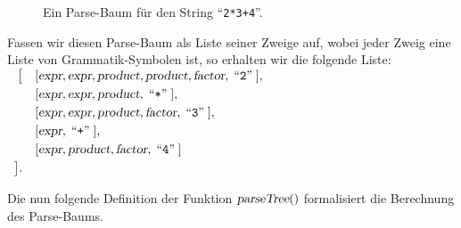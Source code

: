 \begin{figure}[!ht]
  \centering
  \caption{Ein Parse-Baum f\"ur den String ``\texttt{2*3+4}''.}
  \label{fig:parse-tree.dot2}
\end{figure}

Fassen wir diesen Parse-Baum als Liste seiner
Zweige auf, wobei jeder Zweig eine Liste von Grammatik-Symbolen ist, so erhalten wir die folgende Liste:
\\[0.2cm]
\hspace*{1.3cm}
$
\begin{array}[b]{rl}
  \bigl[ 
 & [ \textsl{expr}, \textsl{expr}, \textsl{product}, \textsl{product}, \textsl{factor}, \;\mbox{``\texttt{2}''}\; ],
   \\[0.1cm] 
 & [ \textsl{expr}, \textsl{expr}, \textsl{product}, \;\mbox{``\texttt{*}''}\; ],
   \\[0.1cm] 
 & [ \textsl{expr}, \textsl{expr}, \textsl{product}, \textsl{factor}, \;\mbox{``\texttt{3}''}\; ],
   \\[0.1cm] 
 & [ \textsl{expr}, \;\mbox{``\texttt{+}''}\; ],
   \\[0.1cm] 
 & [ \textsl{expr}, \textsl{product}, \textsl{factor}, \;\mbox{``\texttt{4}''}\; ]
   \\[0.1cm] 
  \bigr]. 
\end{array}
$ \eox
\pagebreak

\noindent
Die nun folgende Definition der Funktion $\textsl{parseTree}()$ formalisiert die
Berechnung des Parse-Baums.

